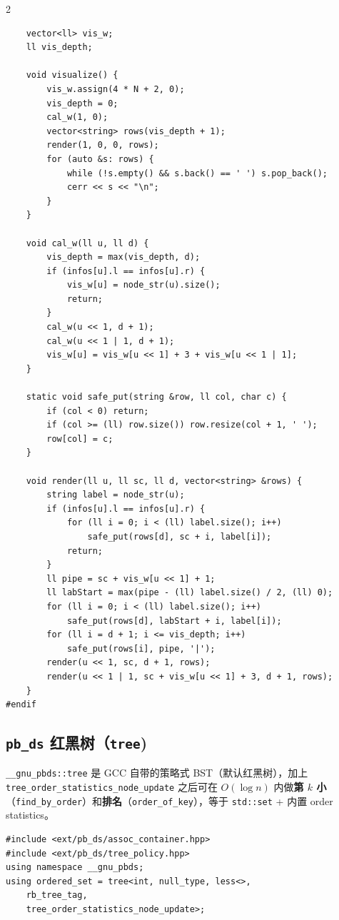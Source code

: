 \begin{multicols*}{2}
\begin{verbatim}
    vector<ll> vis_w;
    ll vis_depth;

    void visualize() {
        vis_w.assign(4 * N + 2, 0);
        vis_depth = 0;
        cal_w(1, 0);
        vector<string> rows(vis_depth + 1);
        render(1, 0, 0, rows);
        for (auto &s: rows) {
            while (!s.empty() && s.back() == ' ') s.pop_back();
            cerr << s << "\n";
        }
    }

    void cal_w(ll u, ll d) {
        vis_depth = max(vis_depth, d);
        if (infos[u].l == infos[u].r) {
            vis_w[u] = node_str(u).size();
            return;
        }
        cal_w(u << 1, d + 1);
        cal_w(u << 1 | 1, d + 1);
        vis_w[u] = vis_w[u << 1] + 3 + vis_w[u << 1 | 1];
    }

    static void safe_put(string &row, ll col, char c) {
        if (col < 0) return;
        if (col >= (ll) row.size()) row.resize(col + 1, ' ');
        row[col] = c;
    }

    void render(ll u, ll sc, ll d, vector<string> &rows) {
        string label = node_str(u);
        if (infos[u].l == infos[u].r) {
            for (ll i = 0; i < (ll) label.size(); i++)
                safe_put(rows[d], sc + i, label[i]);
            return;
        }
        ll pipe = sc + vis_w[u << 1] + 1;
        ll labStart = max(pipe - (ll) label.size() / 2, (ll) 0);
        for (ll i = 0; i < (ll) label.size(); i++)
            safe_put(rows[d], labStart + i, label[i]);
        for (ll i = d + 1; i <= vis_depth; i++)
            safe_put(rows[i], pipe, '|');
        render(u << 1, sc, d + 1, rows);
        render(u << 1 | 1, sc + vis_w[u << 1] + 3, d + 1, rows);
    }
#endif
		\end{verbatim}

		\subsection{\texttt{pb\_ds} 红黑树（\texttt{tree})}

		\verb|__gnu_pbds::tree| 是 GCC 自带的策略式 BST（默认红黑树），加上 \verb|tree_order_statistics_node_update| 之后可在 $O(\log n)$ 内做\textbf{第 $k$ 小}（\verb|find_by_order|）和\textbf{排名}（\verb|order_of_key|），等于 \verb|std::set| + 内置 order statistics。

		\begin{verbatim}
#include <ext/pb_ds/assoc_container.hpp>
#include <ext/pb_ds/tree_policy.hpp>
using namespace __gnu_pbds;
using ordered_set = tree<int, null_type, less<>,
    rb_tree_tag,
    tree_order_statistics_node_update>;
		\end{verbatim}


\end{multicols*}
